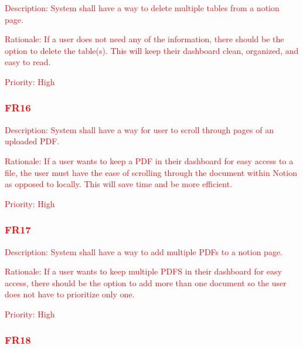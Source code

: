 \documentclass[12pt, titlepage]{article}
\begin{document}
\begin{description}
	\item \textcolor{red}{Description: System shall have a way to delete multiple tables from a notion page.}
	\item \textcolor{red}{Rationale: If a user does not need any of the information, there should be the option to delete the table(s). This will keep their dashboard clean, organized, and easy to read.}
	\item \textcolor{red}{Priority: High}
\end{description}

\subsubsection{\textcolor{red}{FR16}}

\begin{description}
	\item \textcolor{red}{Description: System shall have a way for user to scroll through pages of an uploaded PDF.}
	\item \textcolor{red}{Rationale: If a user wants to keep a PDF in their dashboard for easy access to a file, the user must have the ease of scrolling through the document within Notion as opposed to locally. This will save time and be more efficient.}
	\item \textcolor{red}{Priority: High}
\end{description}

\subsubsection{\textcolor{red}{FR17}}

\begin{description}
	\item \textcolor{red}{Description: System shall have a way to add multiple PDFs to a notion page.}
	\item \textcolor{red}{Rationale: If a user wants to keep multiple PDFS in their dashboard for easy access, there should be the option to add more than one document so the user does not have to prioritize only one. }
	\item \textcolor{red}{Priority: High}
\end{description}

\subsubsection{\textcolor{red}{FR18}}
\end{document}
